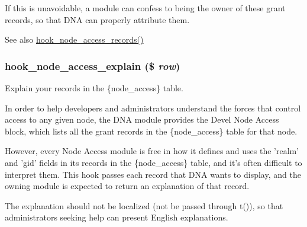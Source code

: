 If this is unavoidable, a module can confess to being the owner of these grant records, so that DNA can properly attribute them.

\begin{DoxySeeAlso}{See also}
\hyperlink{group__node__access_ga3fe7744d74446e40e9b9ad2a782b4269}{hook\_\-node\_\-access\_\-records()} 
\end{DoxySeeAlso}
\hypertarget{group__node__access_gaeedf3adea0813fb3631f26d0de83a68d}{
\subsubsection[{hook\_\-node\_\-access\_\-explain}]{\setlength{\rightskip}{0pt plus 5cm}hook\_\-node\_\-access\_\-explain (\$ {\em row})}}
\label{group__node__access_gaeedf3adea0813fb3631f26d0de83a68d}
Explain your records in the \{node\_\-access\} table.

In order to help developers and administrators understand the forces that control access to any given node, the DNA module provides the Devel Node Access block, which lists all the grant records in the \{node\_\-access\} table for that node.

However, every Node Access module is free in how it defines and uses the 'realm' and 'gid' fields in its records in the \{node\_\-access\} table, and it's often difficult to interpret them. This hook passes each record that DNA wants to display, and the owning module is expected to return an explanation of that record.

The explanation should not be localized (not be passed through t()), so that administrators seeking help can present English explanations.


